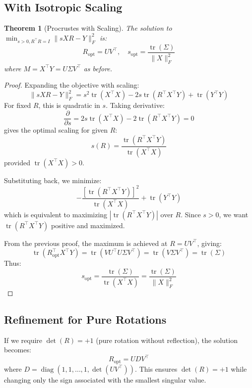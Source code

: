 \documentclass[11pt]{article}
\newtheorem{theorem}{Theorem}
\begin{document}
\subsection{With Isotropic Scaling}
\label{subsec:with-scaling}

\begin{theorem}[Procrustes with Scaling]
The solution to $\min_{s>0, R^\top R=I} \|sXR - Y\|_F^2$ is:
\[
R_{\text{opt}} = U V^\top, \quad s_{\text{opt}} = \frac{\operatorname{tr}(\Sigma)}{\|X\|_F^2}
\]
where $M = X^\top Y = U\Sigma V^\top$ as before.
\end{theorem}

\begin{proof}
Expanding the objective with scaling:
\[
\|sXR - Y\|_F^2 = s^2 \operatorname{tr}(X^\top X) - 2s \operatorname{tr}(R^\top X^\top Y) + \operatorname{tr}(Y^\top Y)
\]
For fixed $R$, this is quadratic in $s$. Taking derivative:
\[
\frac{\partial}{\partial s} = 2s \operatorname{tr}(X^\top X) - 2\operatorname{tr}(R^\top X^\top Y) = 0
\]
gives the optimal scaling for given $R$:
\[
s(R) = \frac{\operatorname{tr}(R^\top X^\top Y)}{\operatorname{tr}(X^\top X)}
\]
provided $\operatorname{tr}(X^\top X) > 0$.

Substituting back, we minimize:
\[
-\frac{[\operatorname{tr}(R^\top X^\top Y)]^2}{\operatorname{tr}(X^\top X)} + \operatorname{tr}(Y^\top Y)
\]
which is equivalent to maximizing $|\operatorname{tr}(R^\top X^\top Y)|$ over $R$. Since $s > 0$, we want $\operatorname{tr}(R^\top X^\top Y)$ positive and maximized.

From the previous proof, the maximum is achieved at $R = U V^\top$, giving:
\[
\operatorname{tr}(R_{\text{opt}}^\top X^\top Y) = \operatorname{tr}(V U^\top U\Sigma V^\top) = \operatorname{tr}(V\Sigma V^\top) = \operatorname{tr}(\Sigma)
\]
Thus:
\[
s_{\text{opt}} = \frac{\operatorname{tr}(\Sigma)}{\operatorname{tr}(X^\top X)} = \frac{\operatorname{tr}(\Sigma)}{\|X\|_F^2}
\]
\end{proof}

\subsection{Refinement for Pure Rotations}
\label{subsec:pure-rotations}

If we require $\det(R) = +1$ (pure rotation without reflection), the solution becomes:
\[
R_{\text{opt}} = U D V^\top
\]
where $D = \operatorname{diag}(1, 1, \dots, 1, \det(U V^\top))$. This ensures $\det(R) = +1$ while changing only the sign associated with the smallest singular value.
\end{document}

